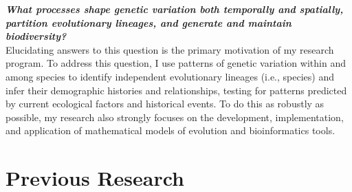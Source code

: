 \documentclass[10pt]{article}
\begin{document}
\raggedright
\singlespacing

\textbf{\textit{What processes shape genetic variation both temporally and
        spatially, partition evolutionary lineages, and generate and maintain
        biodiversity?}} \\
Elucidating answers to this question is the primary motivation of my research
program.
To address this question, I use patterns of genetic variation within and
among species to identify independent evolutionary lineages (i.e., species) and
infer their demographic histories and relationships, testing for patterns
predicted by current ecological factors and historical events.
To do this as robustly as possible, my research also strongly focuses on the
development, implementation, and application of mathematical models of
evolution and bioinformatics tools.

\section*{Previous Research}
\end{document}
